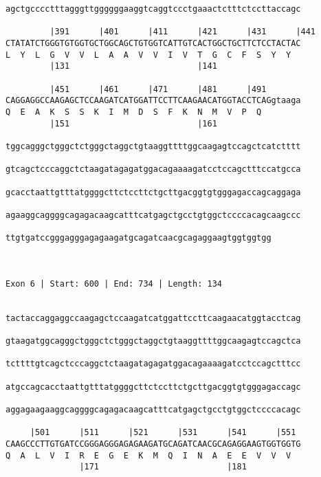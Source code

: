 \documentclass{article}
\begin{document}
\begin{Verbatim}
agctgcccctttagggttggggggaaggtcaggtccctgaaactctttctccttaccagc
                                                            
         |391      |401      |411      |421      |431      |441
CTATATCTGGGTGTGGTGCTGGCAGCTGTGGTCATTGTCACTGGCTGCTTCTCCTACTAC
L  Y  L  G  V  V  L  A  A  V  V  I  V  T  G  C  F  S  Y  Y  
         |131                          |141                 
  
         |451      |461      |471      |481      |491       
CAGGAGGCCAAGAGCTCCAAGATCATGGATTCCTTCAAGAACATGGTACCTCAGgtaaga
Q  E  A  K  S  S  K  I  M  D  S  F  K  N  M  V  P  Q        
         |151                          |161                 
  
tggcagggctgggctctgggctaggctgtaaggttttggcaagagtccagctcatctttt
                                                            
gtcagctcccaggctctaagatagagatggacagaaaagatcctccagctttccatgcca
                                                            
gcacctaattgtttatggggcttctccttctgcttgacggtgtgggagaccagcaggaga
                                                            
agaaggcaggggcagagacaagcatttcatgagctgcctgtggctccccacagcaagccc
                                                            
ttgtgatccgggagggagagaagatgcagatcaacgcagaggaagtggtggtgg
                                                      
                                                      
 
Exon 6 | Start: 600 | End: 734 | Length: 134


tactaccaggaggccaagagctccaagatcatggattccttcaagaacatggtacctcag
                                                            
gtaagatggcagggctgggctctgggctaggctgtaaggttttggcaagagtccagctca
                                                            
tcttttgtcagctcccaggctctaagatagagatggacagaaaagatcctccagctttcc
                                                            
atgccagcacctaattgtttatggggcttctccttctgcttgacggtgtgggagaccagc
                                                            
aggagaagaaggcaggggcagagacaagcatttcatgagctgcctgtggctccccacagc
                                                            
     |501      |511      |521      |531      |541      |551 
CAAGCCCTTGTGATCCGGGAGGGAGAGAAGATGCAGATCAACGCAGAGGAAGTGGTGGTG
Q  A  L  V  I  R  E  G  E  K  M  Q  I  N  A  E  E  V  V  V  
               |171                          |181           
  

\end{Verbatim}
\end{document}

